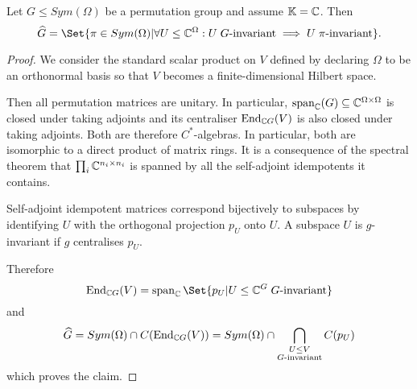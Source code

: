 \documentclass[fontsize=11pt,fleqn,a4paper]{scrartcl}
\begin{document}
\begin{theorem}\label{two_closure:in_terms_of_subspaces}
Let $G\leq Sym(\Omega)$ be a permutation group and assume $\mathbb{K}=\mathbb{C}$. Then
\[\widehat{G} = \Set{\pi\in Sym(\Omega) | \forall U\leq\IC^\Omega: U\;G\text{-invariant} \implies U\;\pi\text{-invariant}}.\]
\end{theorem}
\begin{proof}
We consider the standard scalar product on $V$ defined by declaring $\Omega$ to be an orthonormal basis so that $V$ becomes a finite-dimensional Hilbert space.

Then all permutation matrices are unitary. In particular, $\operatorname{span}_{\mathbb{C}}(G)\subseteq\mathbb{C}^{\Omega\times\Omega}$ is closed under taking adjoints and its centraliser $\operatorname{End}_{\mathbb{C} G}(V)$ is also closed under taking adjoints. Both are therefore $C^\ast$-algebras. In particular, both are isomorphic to a direct product of matrix rings. It is a consequence of the spectral theorem that $\prod_i \mathbb{C}^{n_i\times n_i}$ is spanned by all the self-adjoint idempotents it contains.

\medbreak
Self-adjoint idempotent matrices correspond bijectively to subspaces by identifying $U$ with the orthogonal projection $p_U$ onto $U$. A subspace $U$ is $g$-invariant if $g$ centralises $p_U$.

Therefore
\[\End_{\IC G}(V) = \LinHull_\IC\Set{p_U | U\leq\IC^G\;G\text{-invariant}}\]
and
\[\widehat{G} = Sym(\Omega) \cap C(\operatorname{End}_{\mathbb{C} G}(V)) = Sym(\Omega) \cap \bigcap_{\substack{U\leq V \\ G\text{-invariant}}} C(p_U)\]
which proves the claim.
\end{proof}
\end{document}
